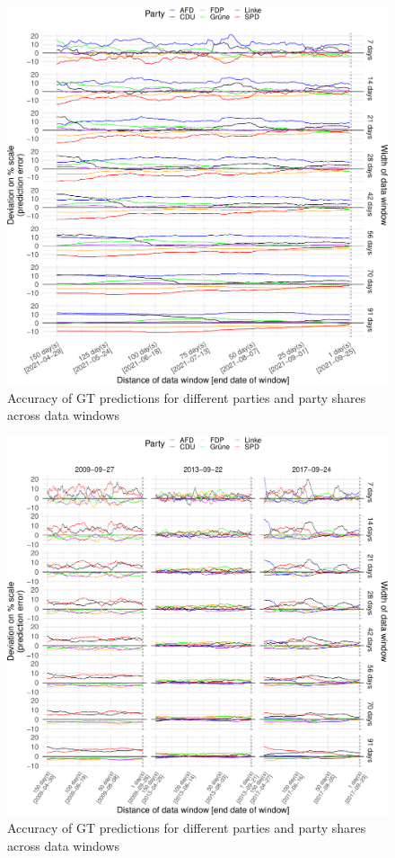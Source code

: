\documentclass[
  letterpaper,
  DIV=11,
  numbers=noendperiod]{scrartcl}
\begin{document}
\begin{figure}[H]

\caption{\label{fig-A4}Accuracy of GT predictions for different parties
and party shares across data windows}

{\centering \includegraphics{figures/fig-A4-1.pdf}

}

\end{figure}

\begin{figure}[H]

\caption{\label{fig-A5}Accuracy of GT predictions for different parties
and party shares across data windows}

{\centering \includegraphics{figures/fig-A5-1.pdf}

}

\end{figure}
\end{document}
